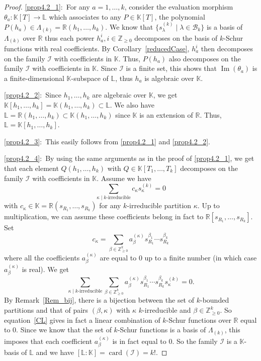 \documentclass[ALCO,ThmDefs,Unicode,epreuves]{cedram}
\DeclareMathOperator{\Imrm}{Im}
\DeclareMathOperator{\card}{card}
\begin{document}
\begin{proof}
\eqref{prop4.2_1}:~For any $a=1,\ldots,k$, consider the evaluation morphism $\theta
_{a}:\mathbb{K}[T]\rightarrow\mathbb{L}$ which associates to any
$P\in\mathbb{K}[T]$, the polynomial $P(h_{a})\in\Lambda_{(k)}\mathbb{=R}%
(h_{1},\ldots,h_{k})$. We know that $\{s_{\lambda}^{(k)}\mid\lambda
\in\mathcal{B}_{k}\}$ is a basis of $\Lambda_{(k)}$ over $\mathbb{R}$ thus
each power $h_{a}^{i},i\in\mathbb{Z}_{\geq0}$ decomposes on the basis of
$k$-Schur functions with real coefficients. By Corollary~\ref{reducedCase},
$h_{a}^{i}$ then decomposes on the family $\mathcal{I}$ with coefficients in
$\mathbb{K}$. Thus, $P(h_{a})$ also decomposes on the family $\mathcal{I}$
with coefficients in $\mathbb{K}$. Since $\mathcal{I}$ is a finite set, this
shows that $\Imrm (\theta_{a})$ is a finite-dimensional $\mathbb{K}%
$-subspace of $\mathbb{L}$, thus $h_{a}$ is algebraic over $\mathbb{K}$.

\eqref{prop4.2_2}:~Since $h_{1},\ldots,h_{k}$ are algebraic over $\mathbb{K}$, we get
$\mathbb{K}[h_{1},\ldots,h_{k}]=\mathbb{K}(h_{1},\ldots,h_{k})\subset
\mathbb{L}$. We also have $\mathbb{L}=\mathbb{R}(h_{1},\ldots,h_{k}%
)\subset\mathbb{K}(h_{1},\ldots,h_{k})$ since $\mathbb{K}$ is an extension of
$\mathbb{R}$. Thus, $\mathbb{L}=\mathbb{K}[h_{1},\ldots,h_{k}]$.

\eqref{prop4.2_3}:~This easily follows from \eqref{prop4.2_1} and \eqref{prop4.2_2}.

\eqref{prop4.2_4}:~By using the same arguments as in the proof of \eqref{prop4.2_1}, we get that each element
$Q(h_{1},\ldots,h_{k})$ with $Q\in\mathbb{K}[T_{1},\ldots,T_{k}]$ decomposes
on the family $\mathcal{I}$ with coefficients in $\mathbb{K}$. Assume we have
\[
\sum_{\kappa\mid k\text{-irreducible}}c_{\kappa}s_{\kappa}^{(k)}=0
\]
with $c_{\kappa}\in\mathbb{K}=\mathbb{R}(s_{R_{1}},\ldots,s_{R_{k}})$ for any
$k$-irreducible partition $\kappa$. Up to multiplication, we can assume these
coefficients belong in fact to $\mathbb{R}[s_{R_{1}},\ldots,s_{R_{k}}]$. Set
\[
c_{\kappa}=\sum_{\beta\in\mathbb{Z}_{\geq0}^{k}}a_{\beta}^{(\kappa)}s_{R_{1}%
}^{\beta_{1}}\cdots s_{R_{k}}^{\beta_{k}}%
\]
where all the coefficients $a_{\beta}^{(\kappa)}$ are equal to $0$ up to a
finite number (in which case $a_{\beta}^{(\kappa)}$ is real). We get%
\begin{equation}
\sum_{\kappa\mid k\text{-irreducible}}\sum_{\beta\in\mathbb{Z}_{\geq0}^{k}%
}a_{\beta}^{(\kappa)}s_{R_{1}}^{\beta_{1}}\cdots s_{R_{k}}^{\beta_{k}%
}s_{\kappa}^{(k)}=0. \label{CL}%
\end{equation}
By Remark~\ref{Rem_bij}, there is a bijection between the set of $k$-bounded
partitions and that of pairs $(\beta,\kappa)$ with $\kappa$ $k$-irreducible
and $\beta\in\mathbb{Z}_{\geq0}^{k}$. So equation~\eqref{CL} gives in fact a
linear combination of $k$-Schur functions over $\mathbb{R}$ equal to $0$.
Since we know that the set of $k$-Schur functions is a basis of $\Lambda
_{(k)}$, this imposes that each coefficient $a_{\beta}^{(\kappa)}$ is in fact
equal to $0$. So the family $\mathcal{I}$ is a $\mathbb{K}$-basis of
$\mathbb{L}$ and we have $[\mathbb{L}:\mathbb{K}]=\card (\mathcal{I}%
)=k!.$


\end{proof}
\end{document}
